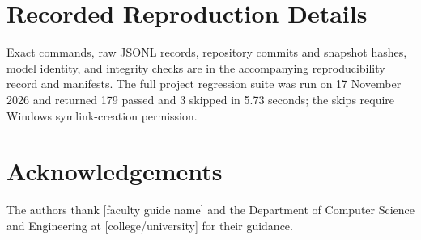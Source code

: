 \documentclass[3p,times,procedia]{elsarticle}
\begin{document}
\appendix
\section{Recorded Reproduction Details}
Exact commands, raw JSONL records, repository commits and snapshot hashes, model identity, and integrity checks are in the accompanying reproducibility record and manifests. The full project regression suite was run on 17 November 2026 and returned 179 passed and 3 skipped in 5.73 seconds; the skips require Windows symlink-creation permission.

\section*{Acknowledgements}
The authors thank [faculty guide name] and the Department of Computer Science and Engineering at [college/university] for their guidance. %
\end{document}
